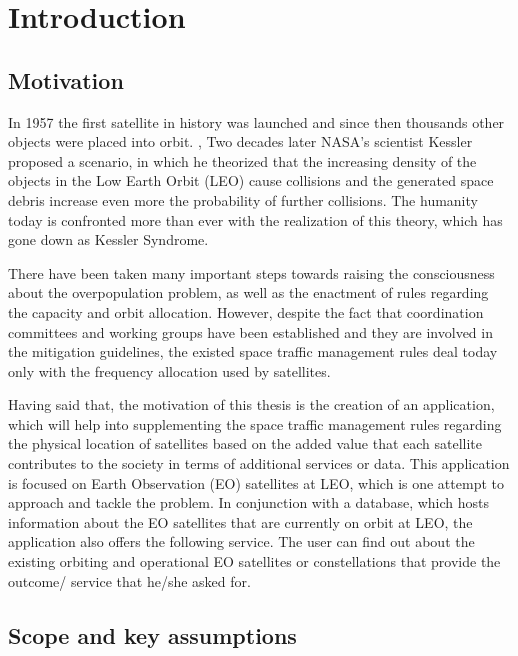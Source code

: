 \chapter{Introduction}
\label{chap:1}

\section{Motivation}
\label{chap:1.1}
\bigskip
\bigskip

In 1957 the first satellite in history was launched and since then thousands other objects were placed into orbit. \cite{Belward 2015}, \cite{ESA 2019} Two decades later NASA’s scientist Kessler proposed a scenario, in which he theorized that the increasing density of the objects in the Low Earth Orbit (LEO) cause collisions and the generated space debris increase even more the probability of further collisions. The humanity today is confronted more than ever with the realization of this theory, which has gone down as Kessler Syndrome.

There have been taken many important steps towards raising the consciousness about the overpopulation problem, as well as the enactment of rules regarding the capacity and orbit allocation. However, despite the fact that coordination committees and working groups have been established and they are involved in the mitigation guidelines, the existed space traffic management rules deal today only with the frequency allocation used by satellites. \cite{Griffin} %

Having said that, the motivation of this thesis is the creation of an application, which will help into supplementing the space traffic management rules regarding the physical location of satellites based on the added value that each satellite contributes to the society in terms of additional services or data. This application is focused on Earth Observation (EO) satellites at LEO, which is one attempt to approach and tackle the problem. In conjunction with a database, which hosts information about the EO satellites that are currently on orbit at LEO, the application also offers the following service. The user can find out about the existing orbiting and operational EO satellites or constellations that provide the outcome/ service that he/she asked for.

\bigskip
\bigskip

\newpage
\section{Scope and key assumptions}
\label{chap:scope}
\bigskip

